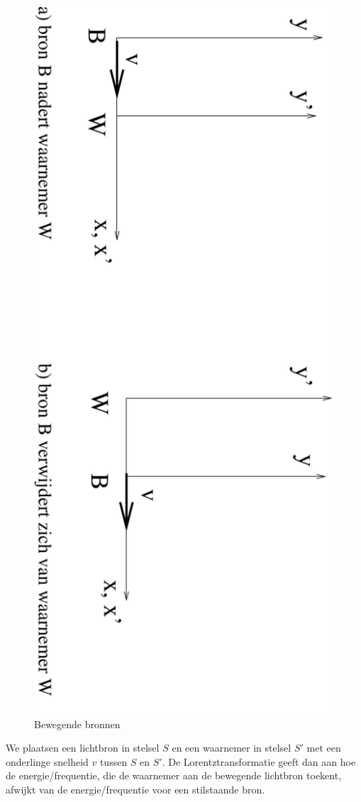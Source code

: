\begin{figure}[ht]
\centering
\includegraphics[width=.8\textwidth]{oefeningen.pictures/doppler}
\caption{Bewegende bronnen}
\label{f:doppler}
\end{figure}

We plaatsen een lichtbron in stelsel $S$ en een waarnemer in
stelsel $S'$ met een onderlinge snelheid $v$ tussen $S$ en $S'$.
De Lorentztransformatie geeft dan aan hoe de energie/frequentie, die de 
waarnemer aan de bewegende lichtbron toekent,
afwijkt van de energie/frequentie voor een stilstaande bron.

